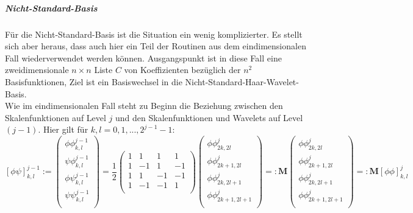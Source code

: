 \subparagraph{Nicht-Standard-Basis} Für die Nicht-Standard-Basis ist die Situation ein wenig komplizierter. Es stellt sich aber heraus, dass auch hier ein Teil der Routinen aus dem eindimensionalen Fall wiederverwendet werden können. Ausgangspunkt ist in diese Fall eine zweidimensionale $n \times n$ Liste $C$ von Koeffizienten bezüglich der $n^2$ Basisfunktionen, Ziel ist ein Basiswechsel in die Nicht-Standard-Haar-Wavelet-Basis.\\
Wie im eindimensionalen Fall steht zu Beginn die Beziehung zwischen den Skalenfunktionen auf Level $j$ und den Skalenfunktionen und Wavelets auf Level $(j-1)$. Hier gilt für $k, l = 0, 1, ..., 2^{j-1}-1$:
%
\[
\left[ \phi\psi \right]_{k,l}^{j-1}
:=
\begin{pmatrix}
\phi\phi_{k,l}^{j-1} \\
\psi\phi_{k,l}^{j-1} \\
\phi\psi_{k,l}^{j-1} \\
\psi\psi_{k,l}^{j-1} \\
\end{pmatrix}
= \frac{1}{2}
\begin{pmatrix}
1 & 1 & 1 & 1 \\
1 & -1 & 1 & -1 \\
1 & 1 & -1 & -1 \\
1 & -1 & -1 & 1 \\
\end{pmatrix}
\begin{pmatrix}
\phi\phi_{2k,2l}^{j} \\
\phi\phi_{2k+1,2l}^{j} \\
\phi\phi_{2k,2l+1}^{j} \\
\phi\phi_{2k+1,2l+1}^{j} \\
\end{pmatrix}
=:
\mathbf{M}
\begin{pmatrix}
\phi\phi_{2k,2l}^{j} \\
\phi\phi_{2k+1,2l}^{j} \\
\phi\phi_{2k,2l+1}^{j} \\
\phi\phi_{2k+1,2l+1}^{j} \\
\end{pmatrix}
=:
\mathbf{M}
\left[ \phi\phi \right]_{k,l}^j
\]
